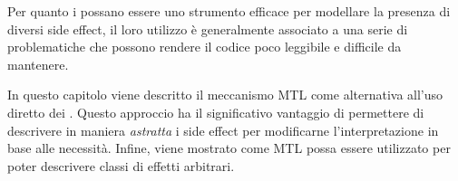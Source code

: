 Per quanto i  possano essere uno strumento efficace per modellare la presenza di diversi side effect, il loro utilizzo è generalmente associato a una serie di problematiche che possono rendere il codice poco leggibile e difficile da mantenere.

In questo capitolo viene descritto il meccanismo \ac{MTL} come alternativa all'uso diretto dei . Questo approccio ha il significativo vantaggio di permettere di descrivere in maniera \emph{astratta} i side effect per modificarne l'interpretazione in base alle necessità.
Infine, viene mostrato come \ac{MTL} possa essere utilizzato per poter descrivere classi di effetti arbitrari.
